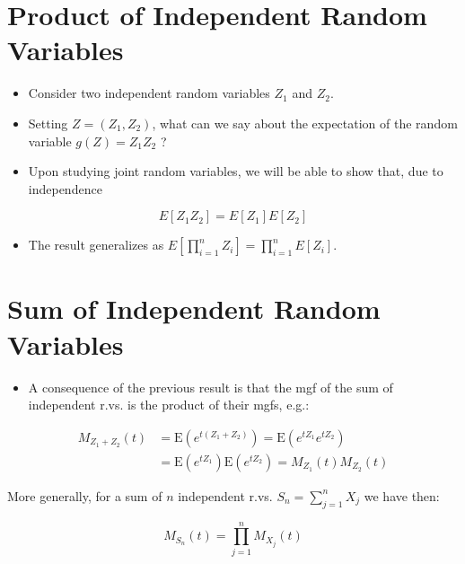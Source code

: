 \documentclass[10pt]{article}
\begin{document}




\section*{Product of Independent Random Variables}
\begin{itemize}
  \item Consider two independent random variables $Z_{1}$ and $Z_{2}$.
  \item Setting $Z=\left(Z_{1}, Z_{2}\right)$, what can we say about the expectation of the random variable $g(Z)=Z_{1} Z_{2}$ ?
  \item Upon studying joint random variables, we will be able to show that, due to independence
\end{itemize}

$$
E\left[Z_{1} Z_{2}\right]=E\left[Z_{1}\right] E\left[Z_{2}\right]
$$

\begin{itemize}
  \item The result generalizes as $E\left[\prod_{i=1}^{n} Z_{i}\right]=\prod_{i=1}^{n} E\left[Z_{i}\right]$.
\end{itemize}

\section*{Sum of Independent Random Variables}
\begin{itemize}
  \item A consequence of the previous result is that the mgf of the sum of independent r.vs. is the product of their mgfs, e.g.:
\end{itemize}

$$
\begin{aligned}
M_{Z_{1}+Z_{2}}(t) & =\mathrm{E}\left(e^{t\left(Z_{1}+Z_{2}\right)}\right)=\mathrm{E}\left(e^{t Z_{1}} e^{t Z_{2}}\right) \\
& =\mathrm{E}\left(e^{t Z_{1}}\right) \mathrm{E}\left(e^{t Z_{2}}\right)=M_{Z_{1}}(t) M_{Z_{2}}(t)
\end{aligned}
$$

More generally, for a sum of $n$ independent r.vs. $S_{n}=\sum_{j=1}^{n} X_{j}$ we have then:

$$
M_{S_{n}}(t)=\prod_{j=1}^{n} M_{X_{j}}(t)
$$
\end{document}
